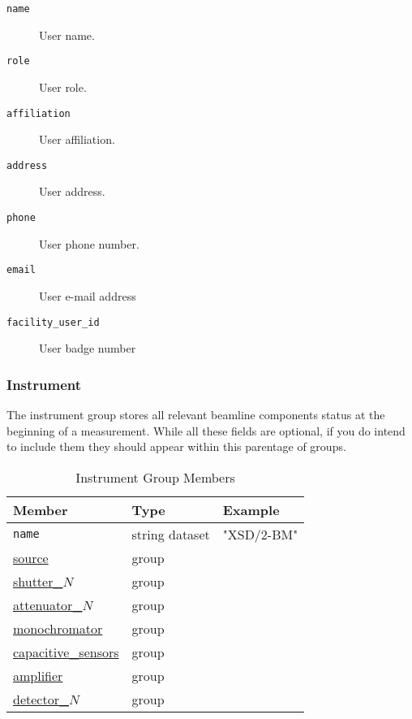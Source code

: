 \begin{description}
\item[\tt {name}] {User name.}    

\item[\tt {role}] {User role.}

\item[\tt {affiliation}] {User affiliation.} 

\item[\tt {address}] {User address.}  

\item[\tt {phone}] {User phone number.} 

\item[\tt {email}] {User e-mail address} 

\item[\tt {facility\_user\_id}] {User badge number }
\end{description}

\subsubsection{Instrument}
\label{table:instrument}

The instrument group stores all relevant beamline components status at the beginning of 
a measurement. While all these fields are optional, if you do intend to include them they 
should appear within this parentage of groups.

\begin{table}[h!]\sffamily \footnotesize
\centering
\caption{Instrument Group Members}
\begin{tabular}{l l l}
\toprule
\bfseries Member     & \bfseries Type & \bfseries Example \\
\midrule

\tt{name} & string dataset & "XSD/2-BM" \\
\hyperref[table:source]{source} &  group & \\
\hyperref[table:shutter]{shutter\_$N$}  &  group & \\
\hyperref[table:attenuator]{attenuator\_$N$} & group & \\
\hyperref[table:monochromator]{monochromator} & group & \\
\hyperref[table:capacitive]{capacitive\_sensors} & group & \\
\hyperref[table:amplifier]{amplifier} & group & \\
\hyperref[table:detector]{detector\_$N$} & group & \\
\bottomrule
\end{tabular}
\end{table}

